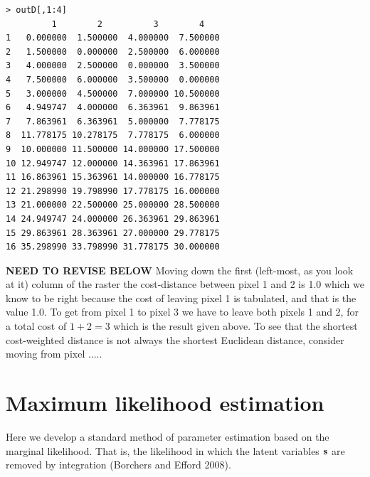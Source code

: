 \small{
\begin{verbatim}
> outD[,1:4]
         1        2          3        4
1   0.000000  1.500000  4.000000  7.500000
2   1.500000  0.000000  2.500000  6.000000
3   4.000000  2.500000  0.000000  3.500000
4   7.500000  6.000000  3.500000  0.000000
5   3.000000  4.500000  7.000000 10.500000
6   4.949747  4.000000  6.363961  9.863961
7   7.863961  6.363961  5.000000  7.778175
8  11.778175 10.278175  7.778175  6.000000
9  10.000000 11.500000 14.000000 17.500000
10 12.949747 12.000000 14.363961 17.863961
11 16.863961 15.363961 14.000000 16.778175
12 21.298990 19.798990 17.778175 16.000000
13 21.000000 22.500000 25.000000 28.500000
14 24.949747 24.000000 26.363961 29.863961
15 29.863961 28.363961 27.000000 29.778175
16 35.298990 33.798990 31.778175 30.000000
\end{verbatim}
}

{\bf NEED TO REVISE BELOW}
Moving down the first (left-most, as you look at it) column of the
raster the cost-distance between pixel 1 and 2 is 1.0 which we know to
be right because the cost of leaving pixel 1 is tabulated, and that is
the value 1.0.  To get from pixel 1 to pixel 3 we have to leave both
pixels 1 and 2, for a total cost of $1+2 = 3$ which is the result
given above.  To see that the shortest cost-weighted distance is not always the
shortest Euclidean distance, consider moving from pixel .....



\section{Maximum likelihood estimation}

Here we develop a standard method of parameter estimation based on
the marginal likelihood. That is, the likelihood in which the latent
variables ${\bf s}$ are removed by integration (Borchers and
Efford 2008). 

